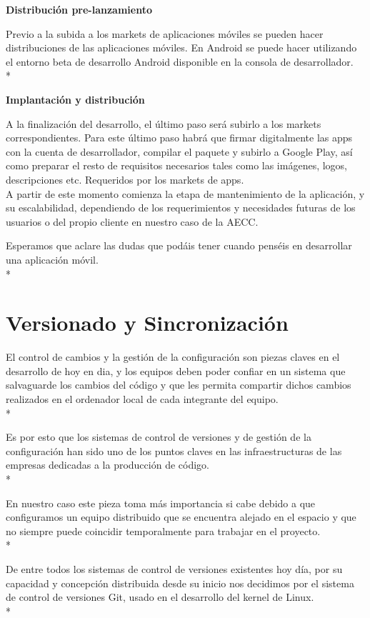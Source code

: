 \documentclass[../pfc.tex]{subfiles}
\begin{document}
	\textbf{Distribución pre-lanzamiento}
	
	Previo a la subida a los markets de aplicaciones móviles se pueden hacer distribuciones de las aplicaciones móviles. En Android se puede hacer utilizando el entorno beta de desarrollo  Android disponible en la consola de desarrollador.\\*
	
	\textbf{Implantación y distribución}
	
	A la finalización del desarrollo, el último paso será subirlo a los markets correspondientes. Para este último paso habrá que firmar digitalmente las apps con la cuenta de desarrollador, compilar el paquete y subirlo a Google Play, así como preparar el resto de requisitos necesarios tales como las imágenes, logos, descripciones etc. Requeridos por los markets de apps.\\
	A partir de este momento comienza la etapa de mantenimiento de la aplicación, y su escalabilidad, dependiendo de los requerimientos y necesidades futuras de los usuarios o del propio cliente en  nuestro caso de la AECC.
	
	Esperamos que aclare las dudas que podáis tener cuando penséis en desarrollar una aplicación móvil.\\*
	
	\section{Versionado y Sincronización}
	El control de cambios y la gestión de la configuración son piezas claves en  el desarrollo de hoy en dia, y los equipos deben poder confiar en un sistema que salvaguarde los cambios del código y que les permita compartir dichos cambios realizados en el ordenador local de cada integrante del equipo.\\*
	
	Es por esto que los sistemas de control de versiones y de gestión de la configuración han sido uno de los puntos claves en las infraestructuras de las empresas dedicadas a la producción de código. \\*
	
	En nuestro caso este pieza toma más importancia si cabe debido a que configuramos un equipo distribuido que se encuentra alejado en el espacio y que no siempre puede coincidir temporalmente para trabajar en el proyecto.\\* 
	
	De entre todos los sistemas de control de versiones existentes hoy día, por su capacidad y concepción distribuida desde su inicio nos decidimos por el sistema de control de versiones Git, usado en el desarrollo del kernel de Linux.\\*
	
\end{document}
